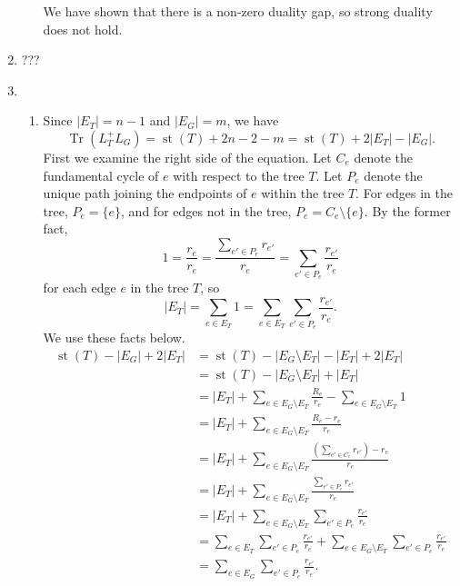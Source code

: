 \documentclass{article}
\newcommand{\0}{\mathbf{0}}
\DeclareMathOperator{\st}{st}
\DeclareMathOperator{\Tr}{Tr}
\begin{document}
\begin{enumerate}
\begin{enumerate}
    We have shown that there is a non-zero duality gap, so strong duality does not hold.
  \end{enumerate}
\item ???
\item
  \begin{enumerate}
  \item Since $|E_T| = n - 1$ and $|E_G| = m$, we have
    \begin{equation*}
      \Tr(L_T^+ L_G) = \st(T) + 2n - 2 - m = \st(T) + 2 |E_T| - |E_G|.
    \end{equation*}
    First we examine the right side of the equation.
    Let $C_e$ denote the fundamental cycle of $e$ with respect to the tree $T$.
    Let $P_e$ denote the unique path joining the endpoints of $e$ within the tree $T$.
    For edges in the tree, $P_e = \{e\}$, and for edges not in the tree, $P_e = C_e \setminus \{e\}$.
    By the former fact,
    \begin{equation*}
      1 = \frac{r_e}{r_e} = \frac{\sum_{e' \in P_e} r_{e'}}{r_e} = \sum_{e' \in P_e} \frac{r_{e'}}{r_e}
    \end{equation*}
    for each edge $e$ in the tree $T$, so
    \begin{equation*}
      |E_T| = \sum_{e \in E_T} 1 = \sum_{e \in E_T} \sum_{e' \in P_e} \frac{r_{e'}}{r_e}.
    \end{equation*}
    We use these facts below.
    \begin{align*}
      \st(T) - |E_G| + 2 |E_T| & = \st(T) - |E_G \setminus E_T| - |E_T| + 2 |E_T| \\
      & = \st(T) - |E_G \setminus E_T| + |E_T| \\
      & = |E_T| + \sum_{e \in E_G \setminus E_T} \frac{R_e}{r_e} - \sum_{e \in E_G \setminus E_T} 1 \\
      & = |E_T| + \sum_{e \in E_G \setminus E_T} \frac{R_e - r_e}{r_e} \\
      & = |E_T| + \sum_{e \in E_G \setminus E_T} \frac{\left(\sum_{e' \in C_e} r_{e'}\right) - r_e}{r_e} \\
      & = |E_T| + \sum_{e \in E_G \setminus E_T} \frac{\sum_{e' \in P_e} r_{e'}}{r_e} \\
      & = |E_T| + \sum_{e \in E_G \setminus E_T} \sum_{e' \in P_e} \frac{r_{e'}}{r_e} \\
      & = \sum_{e \in E_T} \sum_{e' \in P_e} \frac{r_{e'}}{r_e} + \sum_{e \in E_G \setminus E_T} \sum_{e' \in P_e} \frac{r_{e'}}{r_e} \\
      & = \sum_{e \in E_G} \sum_{e' \in P_e} \frac{r_{e'}}{r_e}.
    \end{align*}


\end{enumerate}
\end{enumerate}
\end{document}

